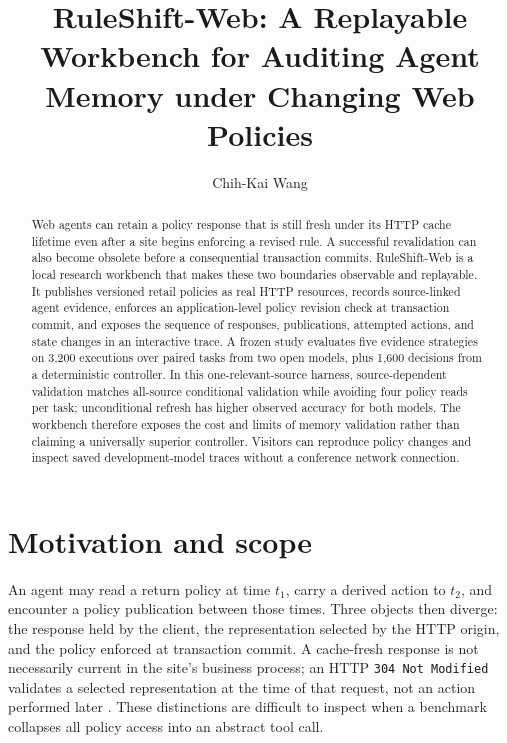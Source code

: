 \documentclass[sigconf,screen,review]{acmart}
\title{RuleShift-Web: A Replayable Workbench for Auditing Agent Memory under Changing Web Policies}
\author{Chih-Kai Wang}
\affiliation{\institution{National Taipei University of Education}\city{Taipei}\country{Taiwan}}
\begin{document}
\begin{abstract}
Web agents can retain a policy response that is still fresh under its HTTP
cache lifetime even after a site begins enforcing a revised rule. A successful
revalidation can also become obsolete before a consequential transaction
commits. RuleShift-Web is a local research workbench that makes these two
boundaries observable and replayable. It publishes versioned retail policies
as real HTTP resources, records source-linked agent evidence, enforces an
application-level policy revision check at transaction commit, and exposes
the sequence of responses, publications, attempted actions, and state changes
in an interactive trace. A frozen study evaluates five evidence strategies
on 3,200 executions over paired tasks from two open models, plus 1,600
decisions from a deterministic controller. In this one-relevant-source
harness, source-dependent validation matches all-source conditional
validation while avoiding four policy reads per task; unconditional refresh
has higher observed accuracy for both models. The workbench
therefore exposes the cost and limits of memory validation rather than
claiming a universally superior controller. Visitors can reproduce policy
changes and inspect saved development-model traces without a conference
network connection.
\end{abstract}

\maketitle

\section{Motivation and scope}
An agent may read a return policy at time $t_1$, carry a derived action to
$t_2$, and encounter a policy publication between those times. Three objects
then diverge: the response held by the client, the representation selected by
the HTTP origin, and the policy enforced at transaction commit. A cache-fresh
response is not necessarily current in the site's business process; an HTTP
\texttt{304 Not Modified} validates a selected representation at the time of
that request, not an action performed later \cite{rfc9110}. These distinctions
are difficult to inspect when a benchmark collapses all policy access into an
abstract tool call.
\end{document}

